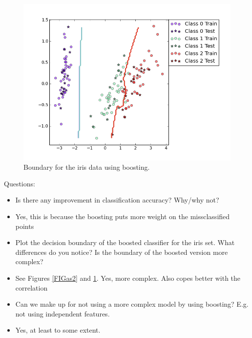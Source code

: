 \documentclass[a4paper,10pt]{article}
\begin{document}
\FloatBarrier
\begin{figure}[h!]
  \center
  \includegraphics[width = 150mm]{figure_3.png}
  \vspace{-15mm}

  \begin{minipage}[t]{95mm}
    \caption{
      Boundary for the iris data using boosting.
    }
    \label{FIGas3}
  \end{minipage}
\end{figure}
\FloatBarrier

\newpage
\noindent
Questions:
\begin{itemize}
  \item[1)] Is there any improvement in classification accuracy? Why/why not?
  \item[A:] Yes, this is because the boosting puts more weight on the
    missclassified points
  \item[2)] Plot the decision boundary of the boosted classifier for the iris set.
    What differences do you notice? Is the boundary of the boosted version more
    complex?
  \item[A:] See Figures \ref{FIGas2} and \ref{FIGas3}. Yes, more complex. Also copes better
    with the correlation
  \item[3)] Can we make up for not using a more complex model by using boosting?
    E.g. not using independent features.
  \item[A:] Yes, at least to some extent.
\end{itemize}
\end{document}
